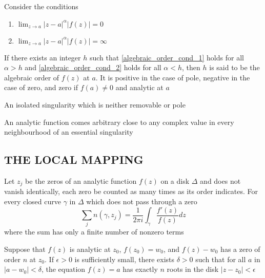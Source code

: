 \documentclass{report}
\begin{document}
\begin{proposition}
    Consider the conditions
    \begin{enumerate}
        \item $\lim_{z \to a} |z - a|^\alpha |f(z)| = 0$ \label{algebraic_order_cond_1}
        \item $\lim_{z \to a} |z - a|^\alpha |f(z)| = \infty$ \label{algebraic_order_cond_2}
    \end{enumerate}
    If there exists an integer $h$ such that \ref{algebraic_order_cond_1} holds for all $\alpha > h$ and \ref{algebraic_order_cond_2} holds for all $\alpha < h$, then $h$ is said to be the algebraic order of $f(z)$ at $a$. It is positive in the case of pole, negative in the case of zero, and zero if $f(a) \neq 0$ and analytic at $a$
\end{proposition}

\begin{definition}
    An isolated singularity which is neither removable or pole
\end{definition}

\begin{theorem}
    An analytic function comes arbitrary close to any complex value in every neighbourhood of an essential singularity
\end{theorem}

\subsection{THE LOCAL MAPPING}

\begin{theorem}
    Let $z_j$ be the zeros of an analytic function $f(z)$ on a disk $\Delta$ and does not vanish identically, each zero be counted as many times as its order indicates. For every closed curve $\gamma$ in $\Delta$ which does not pass through a zero
    \[
        \sum_j n(\gamma, z_j) = \frac{1}{2 \pi i} \int_\gamma \frac{f'(z)}{f(z)} dz
    \]
    where the sum has only a finite number of nonzero terms
\end{theorem}

\begin{theorem}
    Suppose that $f(z)$ is analytic at $z_0$, $f(z_0) = w_0$, and $f(z) - w_0$ has a zero of order $n$ at $z_0$. If $\epsilon > 0$ is sufficiently small, there exists $\delta > 0$ such that for all $a$ in $|a - w_0| < \delta$, the equation $f(z) = a$ has exactly $n$ roots in the disk $|z - z_0| < \epsilon$
\end{theorem}
\end{document}
